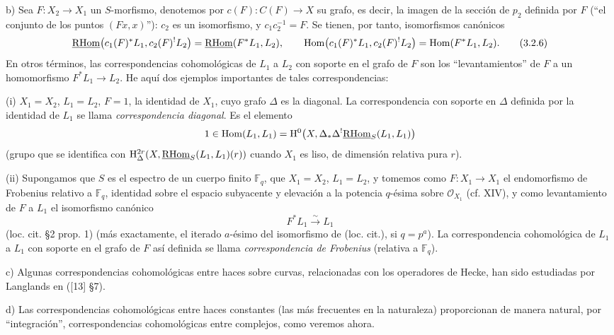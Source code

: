 b) Sea $F:X_2\to X_1$ un $S$-morfismo, denotemos por $c(F):C(F)\to X$ su grafo, es decir, la imagen de la sección de $p_2$ definida por $F$ (``el conjunto de los puntos $(Fx,x)$''): $c_2$ es un isomorfismo, y $c_1c_2^{-1}=F$. Se tienen, por tanto, isomorfismos canónicos
\begin{equation}
\underline{\mathrm{RHom}}\bigl(c_1(F)^*L_1,c_2(F)^!L_2\bigr)=\underline{\mathrm{RHom}}(F^*L_1,L_2),
\qquad
\operatorname{Hom}\bigl(c_1(F)^*L_1,c_2(F)^!L_2\bigr)=\operatorname{Hom}(F^*L_1,L_2).
\tag{3.2.6}
\end{equation}
En otros términos, las correspondencias cohomológicas de $L_1$ a $L_2$ con soporte en el grafo de $F$ son los ``levantamientos'' de $F$ a un homomorfismo $F^*L_1\to L_2$. He aquí dos ejemplos importantes de tales correspondencias:

(i) $X_1=X_2$, $L_1=L_2$, $F=1$, la identidad de $X_1$, cuyo grafo $\Delta$ es la diagonal. La correspondencia con soporte en $\Delta$ definida por la identidad de $L_1$ se llama \emph{correspondencia diagonal}. Es el elemento
\[
1\in \operatorname{Hom}(L_1,L_1)=\mathrm{H}^0\bigl(X,\Delta_*\Delta^!\underline{\mathrm{RHom}}_S(L_1,L_1)\bigr)
\]
(grupo que se identifica con $\mathrm{H}^{2r}_\Delta(X,\underline{\mathrm{RHom}}_S(L_1,L_1)(r))$ cuando $X_1$ es liso, de dimensión relativa pura $r$).

(ii) Supongamos que $S$ es el espectro de un cuerpo finito $\mathbb F_q$, que $X_1=X_2$, $L_1=L_2$, y tomemos como $F:X_1\to X_1$ el endomorfismo de Frobenius relativo a $\mathbb F_q$, identidad sobre el espacio subyacente y elevación a la potencia $q$-ésima sobre $\mathcal O_{X_1}$ (cf. XIV), y como levantamiento de $F$ a $L_1$ el isomorfismo canónico
\[
F^*L_1\xrightarrow{\sim}L_1
\]
(loc. cit. §2 prop. 1) (más exactamente, el iterado $a$-ésimo del isomorfismo de (loc. cit.), si $q=p^a$). La correspondencia cohomológica de $L_1$ a $L_1$ con soporte en el grafo de $F$ así definida se llama \emph{correspondencia de Frobenius} (relativa a $\mathbb F_q$).

c) Algunas correspondencias cohomológicas entre haces sobre curvas, relacionadas con los operadores de Hecke, han sido estudiadas por Langlands en ([13] §7).

d) Las correspondencias cohomológicas entre haces constantes (las más frecuentes en la naturaleza) proporcionan de manera natural, por ``integración'', correspondencias cohomológicas entre complejos, como veremos ahora.
